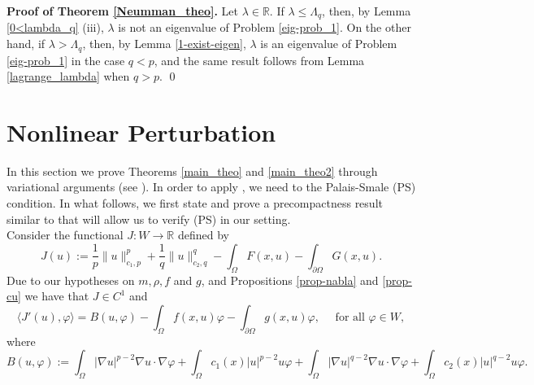 \documentclass[pdflatex,sn-mathphys-num]{sn-jnl}
\theoremstyle{thmstyleone}%
\theoremstyle{thmstyletwo}%
\theoremstyle{thmstylethree}%
\theoremstyle{thmstylethree}%
\begin{document}
\vskip0.4cm 
\noindent
{\bf Proof of Theorem  \ref{Neumman_theo}.}\mbox{}
\vskip0.2cm 
\noindent
    Let $\lambda \in \mathbb{R}$. If $\lambda \leqslant \Lambda_q$, then, by Lemma \ref{0<lambda_q} (iii), $\lambda$ is not an eigenvalue of Problem \eqref{eig-prob_1}. On the other hand, if $\lambda >\Lambda_q$, then, by Lemma \ref{1-exist-eigen}, $\lambda$ is an eigenvalue of Problem \eqref{eig-prob_1} in the case $q<p$, and the same result follows from Lemma \ref{lagrange_lambda} when $q>p$. \qed

\vskip0.4cm 
\section{Nonlinear Perturbation} 
In this section we prove Theorems \ref{main_theo} and \ref{main_theo2}  through variational arguments (see \cite[Theorem 2.7]{PR}). In order to apply  \cite[Theorem 2.7]{PR}, we need to the Palais-Smale (PS) condition. In what follows,  we first state and prove a precompactness result similar to \cite[Proposition B.35]{PR} that will allow us to verify (PS) in our setting.\\


Consider the functional $J:W \to \mathbb{R}$ defined by \begin{equation}\label{def_J} 
    J(u):= \frac{1}{p}\|u\|_{c_1,p}^p+\frac{1}{q}\|u\|_{c_2,q}^q-\int_\Omega F(x,u)  - \int_{\partial\Omega} G(x,u).
\end{equation}
Due to our hypotheses on $m, \rho, f$ and $g$, and Propositions \ref{prop-nabla} and \ref{prop-cu} we have that $J\in C^1$  and 
\begin{equation}\label{form_J'}    \langle J' (u), \varphi  \rangle= B(u, \varphi)-\int_\Omega f(x,u)\varphi - \int_{\partial\Omega} g(x,u)\varphi  , \quad \text{ for all $\varphi \in W$},
\end{equation}
where 
\begin{equation}\label{B(u,phi)}
    B(u, \varphi):=\int_\Omega |\nabla u|^{p-2}\nabla u\cdot \nabla \varphi +\int_\Omega c_1(x)| u|^{p-2} u \varphi +\int_\Omega |\nabla u|^{q-2}\nabla u\cdot \nabla \varphi+\int_\Omega c_2(x) | u|^{q-2} u \varphi  .
\end{equation}
\end{document}
